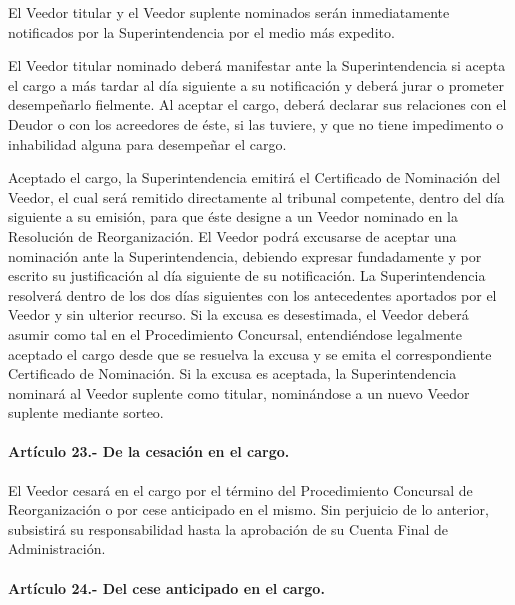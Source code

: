 \documentclass[
]{book}
\begin{document}
El Veedor titular y el Veedor suplente nominados serán inmediatamente notificados por la Superintendencia por el medio más expedito.

El Veedor titular nominado deberá manifestar ante la Superintendencia si acepta el cargo a más tardar al día siguiente a su notificación y deberá jurar o prometer desempeñarlo fielmente. Al aceptar el cargo, deberá declarar sus relaciones con el Deudor o con los acreedores de éste, si las tuviere, y que no tiene impedimento o inhabilidad alguna para desempeñar el cargo.

Aceptado el cargo, la Superintendencia emitirá el Certificado de Nominación del Veedor, el cual será remitido directamente al tribunal competente, dentro del día siguiente a su emisión, para que éste designe a un Veedor nominado en la Resolución de Reorganización.
El Veedor podrá excusarse de aceptar una nominación ante la Superintendencia, debiendo expresar fundadamente y por escrito su justificación al día siguiente de su notificación. La Superintendencia resolverá dentro de los dos días siguientes con los antecedentes aportados por el Veedor y sin ulterior recurso. Si la excusa es desestimada, el Veedor deberá asumir como tal en el Procedimiento Concursal, entendiéndose legalmente aceptado el cargo desde que se resuelva la excusa y se emita el correspondiente Certificado de Nominación. Si la excusa es aceptada, la Superintendencia nominará al Veedor suplente como titular, nominándose a un nuevo Veedor suplente mediante sorteo.

\hypertarget{artuxedculo-23.--de-la-cesaciuxf3n-en-el-cargo.}{%
\paragraph*{Artículo 23.- De la cesación en el cargo.}\label{artuxedculo-23.--de-la-cesaciuxf3n-en-el-cargo.}}

El Veedor cesará en el cargo por el término del Procedimiento Concursal de Reorganización o por cese anticipado en el mismo. Sin perjuicio de lo anterior, subsistirá su responsabilidad hasta la aprobación de su Cuenta Final de Administración.

\hypertarget{artuxedculo-24.--del-cese-anticipado-en-el-cargo.}{%
\paragraph*{Artículo 24.- Del cese anticipado en el cargo.}\label{artuxedculo-24.--del-cese-anticipado-en-el-cargo.}}
\end{document}
